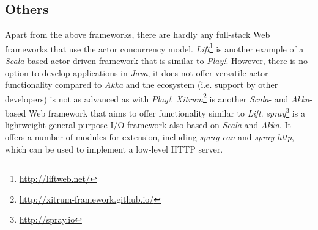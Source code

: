\subsection{Others}
Apart from the above frameworks, there are hardly any full-stack Web frameworks that use the actor concurrency model. \textit{Lift}\footnote{\url{http://liftweb.net/}} is another example of a \textit{Scala}-based actor-driven framework that is similar to \textit{Play!}. However, there is no option to develop applications in \textit{Java}, it does not offer versatile actor functionality compared to \textit{Akka} and the ecosystem (i.e. support by other developers) is not as advanced as with \textit{Play!}. \textit{Xitrum}\footnote{\url{http://xitrum-framework.github.io/}} is another \textit{Scala}- and \textit{Akka}-based Web framework that aims to offer functionality similar to \textit{Lift}. \textit{spray}\footnote{\url{http://spray.io}} is a lightweight general-purpose I/O framework also based on \textit{Scala} and \textit{Akka}. It offers a number of modules for extension, including \textit{spray-can} and \textit{spray-http}, which can be used to implement a low-level HTTP server.




